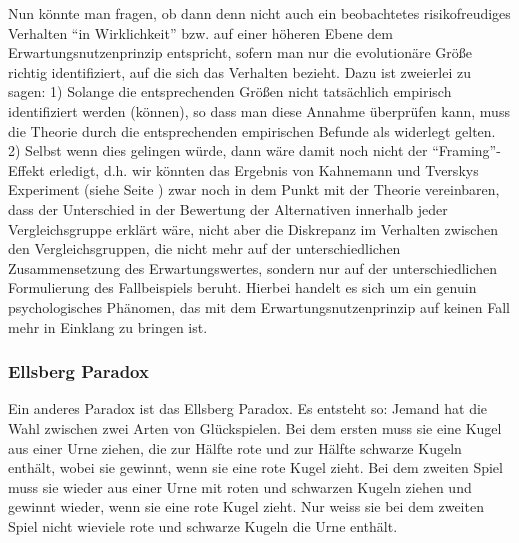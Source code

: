 Nun könnte man fragen, ob dann denn nicht auch ein beobachtetes risikofreudiges
Verhalten "`in Wirklichkeit"' bzw. auf einer höheren Ebene dem
Erwartungsnutzenprinzip entspricht, sofern man nur die evolutionäre Größe richtig
identifiziert, auf die sich das Verhalten bezieht. Dazu ist zweierlei zu sagen:
1) Solange die entsprechenden Größen nicht tatsächlich empirisch identifiziert
werden (können), so dass man diese Annahme überprüfen kann, muss die Theorie
durch die entsprechenden empirischen Befunde als widerlegt gelten. 
2) Selbst wenn
dies gelingen würde, dann wäre damit noch nicht der "`Framing"'-Effekt erledigt,
d.h. wir könnten das Ergebnis von Kahnemann und Tverskys Experiment (siehe Seite
\pageref{tverskyBeispiel}) zwar noch in dem Punkt mit der Theorie vereinbaren,
dass der Unterschied in der Bewertung der Alternativen innerhalb jeder
Vergleichsgruppe erklärt wäre, nicht aber die Diskrepanz im Verhalten zwischen
den Vergleichsgruppen, die nicht mehr auf der unterschiedlichen Zusammensetzung
des Erwartungswertes, sondern nur auf der unterschiedlichen Formulierung des
Fallbeispiels beruht. Hierbei handelt es sich um ein genuin psychologisches
Phänomen, das mit dem Erwartungsnutzenprinzip auf keinen Fall mehr in Einklang
zu bringen ist.

\subsubsection{Ellsberg Paradox}

Ein anderes Paradox ist das Ellsberg Paradox. Es entsteht so: Jemand hat die Wahl
zwischen zwei Arten von Glückspielen. Bei dem ersten muss sie eine Kugel aus
einer Urne ziehen, die zur Hälfte rote und zur Hälfte schwarze Kugeln enthält,
wobei sie gewinnt, wenn sie eine rote Kugel zieht. Bei dem zweiten Spiel muss sie
wieder aus einer Urne mit roten und schwarzen Kugeln ziehen und gewinnt wieder,
wenn sie eine rote Kugel zieht. Nur weiss sie bei dem zweiten Spiel nicht
wieviele rote und schwarze Kugeln die Urne enthält.

